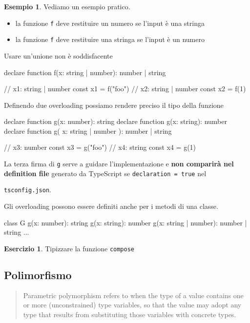 \documentclass[12pt]{article}
\theoremstyle{definition}
\newtheorem{example}{Esempio}[subsection]
\newtheorem{exercise}{Esercizio}[subsection]
\newenvironment{code}
  {\vspace{0.5cm} \VerbatimEnvironment\begin{typescriptcode}}
  {\end{typescriptcode} \vspace{0.2cm}}
\begin{document}
\begin{example}
Vediamo un esempio pratico.

\begin{itemize}
  \item la funzione \texttt{f} deve restituire un numero se l'input è una stringa
  \item la funzione \texttt{f} deve restituire una stringa se l'input è un numero
\end{itemize}

Usare un'unione non è soddisfacente

\begin{code}
declare function f(x: string | number): number | string

// x1: string | number
const x1 = f("foo")
// x2: string | number
const x2 = f(1)
\end{code}

Definendo due overloading possiamo rendere preciso il tipo della funzione

\begin{code}
declare function g(x: number): string
declare function g(x: string): number
declare function g(
  x: string | number
): number | string

// x3: number
const x3 = g("foo")
// x4: string
const x4 = g(1)
\end{code}

La terza firma di \texttt{g} serve a guidare l'implementazione e \textbf{non comparirà nel definition file}
generato da TypeScript se \texttt{declaration = true} nel

\texttt{tsconfig.json}.

Gli overloading possono essere definiti anche per i metodi di una classe.

\begin{code}
class G {
  g(x: number): string
  g(x: string): number
  g(x: string | number): number | string {
    ...
  }
}
\end{code}

\begin{exercise}
Tipizzare la funzione \texttt{compose}
\end{exercise}

\end{example}

\subsection{Polimorfismo}

\begin{quote}
Parametric polymorphism refers to when the type of a value contains one or more (unconstrained) type variables,
so that the value may adopt any type that results from substituting those variables with concrete types.
\end{quote}
\end{document}
